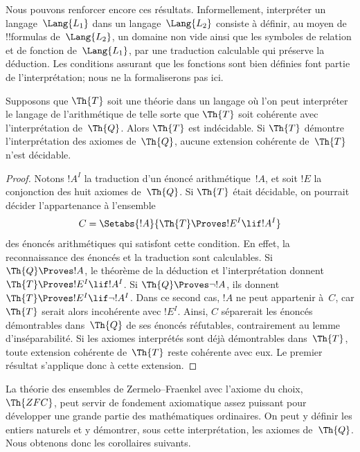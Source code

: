 \documentclass[../../../include/open-logic-section]{subfiles}
\begin{document}


Nous pouvons renforcer encore ces résultats.
Informellement, interpréter un langage~$\Lang{L_1}$
dans un langage~$\Lang{L_2}$ consiste à définir,
au moyen de !!{formula}s de~$\Lang{L_2}$,
un domaine non vide ainsi que les symboles de relation et
de fonction de~$\Lang{L_1}$, par une traduction calculable qui préserve la déduction.
Les conditions assurant que les fonctions sont bien définies font partie de l'interprétation; nous ne la formaliserons pas ici.

\begin{thm}
Supposons que $\Th{T}$ soit une théorie dans un
langage où l'on peut interpréter le langage de
l'arithmétique de telle sorte que $\Th{T}$ soit
cohérente avec l'interprétation de~$\Th{Q}$.
Alors $\Th{T}$ est indécidable. Si $\Th{T}$
démontre l'interprétation des axiomes de~$\Th{Q}$,
aucune extension cohérente de~$\Th{T}$ n'est
décidable.
\end{thm}

\begin{proof}
Notons $!A^I$ la traduction d'un énoncé arithmétique~$!A$,
et soit $!E$ la conjonction des huit axiomes de~$\Th{Q}$.
Si $\Th{T}$ était décidable, on pourrait décider
l'appartenance à l'ensemble
\[
C=\Setabs{!A}{\Th{T}\Proves !E^I\lif !A^I}
\]
des énoncés arithmétiques qui satisfont cette condition.
En effet, la reconnaissance des énoncés et la traduction
sont calculables.
Si $\Th{Q}\Proves !A$, le théorème de la déduction et
l'interprétation donnent $\Th{T}\Proves !E^I\lif !A^I$.
Si $\Th{Q}\Proves\lnot !A$, ils donnent
$\Th{T}\Proves !E^I\lif\lnot !A^I$. Dans ce second cas,
$!A$ ne peut appartenir à~$C$, car $\Th{T}$ serait alors
incohérente avec $!E^I$. Ainsi, $C$ séparerait les
énoncés démontrables dans~$\Th{Q}$ de ses énoncés
réfutables, contrairement au lemme d'inséparabilité.
Si les axiomes interprétés sont déjà démontrables dans~$\Th{T}$,
toute extension cohérente de~$\Th{T}$ reste cohérente
avec eux. Le premier résultat s'applique donc à cette extension.
\end{proof}
La théorie des ensembles de Zermelo--Fraenkel avec
l'axiome du choix, $\Th{ZFC}$, peut servir de
fondement axiomatique assez puissant pour développer
une grande partie des mathématiques ordinaires.
On peut y définir les entiers naturels et y démontrer,
sous cette interprétation, les axiomes de~$\Th{Q}$.
Nous obtenons donc les corollaires suivants.
\end{document}
